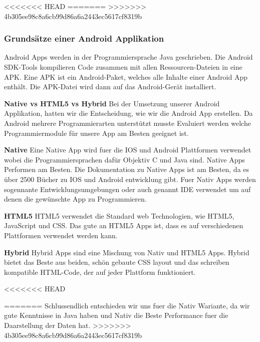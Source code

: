 <<<<<<< HEAD
=======
>>>>>>> 4b305ee98c8a6cb99d86a6a2443ec5617cf8319b
\subsubsection{Grundsätze einer Android Applikation}
\label{subsec:aapp-fundam}

Android Apps werden in der Programmiersprache Java geschrieben.
Die Android SDK-Tools kompilieren Code zusammen mit allen Ressourcen-Dateien in eine APK.
Eine APK ist ein Android-Paket, welches alle Inhalte einer Android App enthält. 
Die APK-Datei wird dann auf das Android-Gerät installiert. 


\textbf{Native vs HTML5 vs Hybrid}
Bei der Umsetzung unserer Android Applikation, hatten wir die Entscheidung, wie wir die Android App erstellen. 
Da Android mehrere Programmierarten unterstützt musste Evaluiert werden welche Programmiermodule für unsere App am Besten geeignet ist. \nextline

\textbf{Native\newline} 
Eine Native App wird fuer die IOS und Android Plattformen verwendet wobei die Programmiersprachen dafür Objektiv C und Java sind.
Native Apps Performen am Besten.
Die Dokumentation zu Native Apps ist am Besten, da es über 2500 Bücher zu IOS und Android entwicklung gibt.
Fuer Nativ Apps werden sogennante Entwicklungsumgebungen oder auch genannt IDE verwendet um auf denen die gewünschte App zu Programmieren.\nextline

\textbf{HTML5\newline} 
HTML5 verwendet die Standard web Technologien, wie HTML5, JavaScript und CSS. Das gute an HTML5 Apps ist, dass es auf verschiedenen Plattformen verwendet werden kann.\nextline

\textbf{Hybrid\newline} 
Hybrid Apps sind eine Mischung von Nativ und HTML5 Apps. Hybrid bietet das Beste aus beiden, schön gebaute CSS layout und das schreiben kompatible HTML-Code, der auf jeder Plattform funktioniert.\nextline

<<<<<<< HEAD

=======
Schlussendlich entschieden wir uns fuer die Nativ Wariante, da wir gute Kenntnisse in Java haben und Nativ die Beste Performance fuer die Daarstellung der Daten hat.
>>>>>>> 4b305ee98c8a6cb99d86a6a2443ec5617cf8319b
\clearpage %